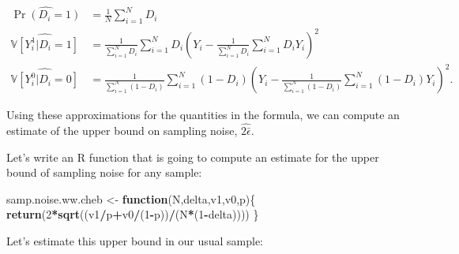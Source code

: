 \documentclass[]{book}
\newenvironment{Shaded}{\begin{snugshade}}{\end{snugshade}}
\newcommand{\ControlFlowTok}[1]{\textcolor[rgb]{0.13,0.29,0.53}{\textbf{#1}}}
\newcommand{\DecValTok}[1]{\textcolor[rgb]{0.00,0.00,0.81}{#1}}
\newcommand{\KeywordTok}[1]{\textcolor[rgb]{0.13,0.29,0.53}{\textbf{#1}}}
\newcommand{\NormalTok}[1]{#1}
\newcommand{\OperatorTok}[1]{\textcolor[rgb]{0.81,0.36,0.00}{\textbf{#1}}}
\newcommand{\StringTok}[1]{\textcolor[rgb]{0.31,0.60,0.02}{#1}}
\newcommand{\var}[1]{\mathbb{V}[ #1 ]}
\theoremstyle{definition}
\theoremstyle{definition}
\theoremstyle{definition}
\theoremstyle{remark}
\let\BeginKnitrBlock\begin \let\EndKnitrBlock\end
\begin{document}
\begin{align*}
  \hat{\Pr(D_i=1)} & = \frac{1}{N}\sum_{i=1}^ND_i\\
  \hat{\var{Y_i^1|D_i=1}} & = \frac{1}{\sum_{i=1}^ND_i}\sum_{i=1}^ND_i(Y_i-\frac{1}{\sum_{i=1}^ND_i}\sum_{i=1}^ND_iY_i)^2\\
  \hat{\var{Y_i^0|D_i=0}} & = \frac{1}{\sum_{i=1}^N(1-D_i)}\sum_{i=1}^N(1-D_i)(Y_i-\frac{1}{\sum_{i=1}^N(1-D_i)}\sum_{i=1}^N(1-D_i)Y_i)^2.
\end{align*}

Using these approximations for the quantities in the formula, we can compute an estimate of the upper bound on sampling noise, \(\hat{2\bar{\epsilon}}\).

\BeginKnitrBlock{example}
\protect\hypertarget{exm:unnamed-chunk-47}{}{\label{exm:unnamed-chunk-47} }Let's write an R function that is going to compute an estimate for the upper bound of sampling noise for any sample:
\EndKnitrBlock{example}

\begin{Shaded}
\begin{Highlighting}[]
\NormalTok{samp.noise.ww.cheb <-}\StringTok{ }\ControlFlowTok{function}\NormalTok{(N,delta,v1,v0,p)\{}
  \KeywordTok{return}\NormalTok{(}\DecValTok{2}\OperatorTok{*}\KeywordTok{sqrt}\NormalTok{((v1}\OperatorTok{/}\NormalTok{p}\OperatorTok{+}\NormalTok{v0}\OperatorTok{/}\NormalTok{(}\DecValTok{1}\OperatorTok{-}\NormalTok{p))}\OperatorTok{/}\NormalTok{(N}\OperatorTok{*}\NormalTok{(}\DecValTok{1}\OperatorTok{-}\NormalTok{delta))))}
\NormalTok{\}}
\end{Highlighting}
\end{Shaded}

Let's estimate this upper bound in our usual sample:
\end{document}
